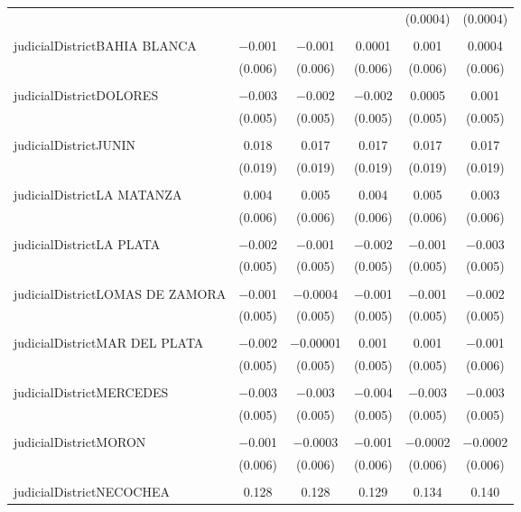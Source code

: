 \documentclass{article}
\begin{document}
\begin{table}[!htbp]
{\begin{tabular}{@{\extracolsep{5pt}}lccccc}
  &  &  &  & (0.0004) & (0.0004) \\ 
  & & & & & \\ 
 judicialDistrictBAHIA BLANCA & $-$0.001 & $-$0.001 & 0.0001 & 0.001 & 0.0004 \\ 
  & (0.006) & (0.006) & (0.006) & (0.006) & (0.006) \\ 
  & & & & & \\ 
 judicialDistrictDOLORES & $-$0.003 & $-$0.002 & $-$0.002 & 0.0005 & 0.001 \\ 
  & (0.005) & (0.005) & (0.005) & (0.005) & (0.005) \\ 
  & & & & & \\ 
 judicialDistrictJUNIN & 0.018 & 0.017 & 0.017 & 0.017 & 0.017 \\ 
  & (0.019) & (0.019) & (0.019) & (0.019) & (0.019) \\ 
  & & & & & \\ 
 judicialDistrictLA MATANZA & 0.004 & 0.005 & 0.004 & 0.005 & 0.003 \\ 
  & (0.006) & (0.006) & (0.006) & (0.006) & (0.006) \\ 
  & & & & & \\ 
 judicialDistrictLA PLATA & $-$0.002 & $-$0.001 & $-$0.002 & $-$0.001 & $-$0.003 \\ 
  & (0.005) & (0.005) & (0.005) & (0.005) & (0.005) \\ 
  & & & & & \\ 
 judicialDistrictLOMAS DE ZAMORA & $-$0.001 & $-$0.0004 & $-$0.001 & $-$0.001 & $-$0.002 \\ 
  & (0.005) & (0.005) & (0.005) & (0.005) & (0.005) \\ 
  & & & & & \\ 
 judicialDistrictMAR DEL PLATA & $-$0.002 & $-$0.00001 & 0.001 & 0.001 & $-$0.001 \\ 
  & (0.005) & (0.005) & (0.005) & (0.005) & (0.006) \\ 
  & & & & & \\ 
 judicialDistrictMERCEDES & $-$0.003 & $-$0.003 & $-$0.004 & $-$0.003 & $-$0.003 \\ 
  & (0.005) & (0.005) & (0.005) & (0.005) & (0.005) \\ 
  & & & & & \\ 
 judicialDistrictMORON & $-$0.001 & $-$0.0003 & $-$0.001 & $-$0.0002 & $-$0.0002 \\ 
  & (0.006) & (0.006) & (0.006) & (0.006) & (0.006) \\ 
  & & & & & \\ 
 judicialDistrictNECOCHEA & 0.128 & 0.128 & 0.129 & 0.134 & 0.140 \\ 

\end{tabular}}
\end{table}
\end{document}
